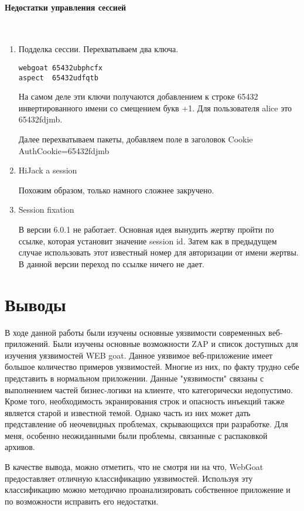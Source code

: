 \documentclass{article}
\begin{document}
\paragraph{Недостатки управления сессией}
~

\begin{enumerate}

\item Подделка сессии. Перехватываем два ключа.

\begin{verbatim}
webgoat 65432ubphcfx
aspect  65432udfqtb
\end{verbatim}

На самом деле эти ключи получаются добавлением к строке 65432 инвертированного имени со смещением букв +1. Для пользователя alice это 65432fdjmb.

Далее перехватываем пакеты, добавляем поле в заголовок Cookie AuthCookie=65432fdjmb

\item HiJack a session

Похожим образом, только намного сложнее закручено.

\item Session fixation

В версии 6.0.1 не работает. Основная идея вынудить жертву пройти по ссылке, которая установит значение session id. Затем как в предыдущем случае использовать этот известный номер для авторизации от имени жертвы. В данной версии переход по ссылке ничего не дает.
\end{enumerate}

\section{Выводы}

В ходе данной работы были изучены основные уязвимости современных веб-приложений. Были изучены основные возможности ZAP и список доступных для изучения уязвимостей WEB goat. Данное уязвимое веб-приложение имеет большое количество примеров уязвимостей. Многие из них, по факту трудно себе представить в нормальном приложении. Данные "уязвимости" связаны с выполнением частей бизнес-логики на клиенте, что категорически недопустимо. Кроме того, необходимость экранирования строк и опасность инъекций также является старой и известной темой.  Однако часть из них может дать представление об неочевидных проблемах, скрывающихся при разработке. Для меня, особенно неожиданными были проблемы, связанные с распаковкой архивов.

В качестве вывода, можно отметить, что не смотря ни на что, WebGoat предоставляет отличную классификацию уязвимостей. Используя эту классификацию можно методично проанализировать собственное приложение и по возможности исправить его недостатки.
 
\end{document}
